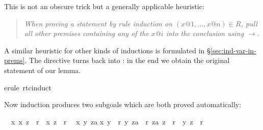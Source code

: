 \begin{isabellebody}
%
\isatagproof
%
\begin{isamarkuptxt}%
\noindent
This is not an obscure trick but a generally applicable heuristic:
\begin{quote}\em
When proving a statement by rule induction on $(x@1,\dots,x@n) \in R$,
pull all other premises containing any of the $x@i$ into the conclusion
using $\longrightarrow$.
\end{quote}
A similar heuristic for other kinds of inductions is formulated in
\S\ref{sec:ind-var-in-prems}. The  directive turns
 back into : in the end we obtain the original
statement of our lemma.%
\end{isamarkuptxt}%
\isamarkuptrue%
\isamarkupfalse%
{}erule\ rtc{}induct{}%
\begin{isamarkuptxt}%
\noindent
Now induction produces two subgoals which are both proved automatically:
\begin{isabelle}%
\ {}{}\ {}x{}\ {}x{}\ z{}\ {}\ r{}\ {}\ {}x{}\ z{}\ {}\ r{}\isanewline
\ {}{}\ {}x\ y\ za{}\isanewline
{}x{}\ y{}\ {}\ r{}\ {}y{}\ za{}\ {}\ r{}{}\ {}za{}\ z{}\ {}\ r{}\ {}\ {}y{}\ z{}\ {}\ r{}{}\isanewline

\end{isabelle}
\end{isamarkuptxt}
\end{isabellebody}
